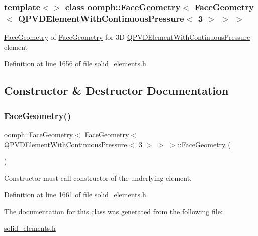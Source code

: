 \subsubsection*{template$<$$>$\newline
class oomph\+::\+Face\+Geometry$<$ Face\+Geometry$<$ Q\+P\+V\+D\+Element\+With\+Continuous\+Pressure$<$ 3 $>$ $>$ $>$}

\hyperlink{classoomph_1_1FaceGeometry}{Face\+Geometry} of \hyperlink{classoomph_1_1FaceGeometry}{Face\+Geometry} for 3D \hyperlink{classoomph_1_1QPVDElementWithContinuousPressure}{Q\+P\+V\+D\+Element\+With\+Continuous\+Pressure} element 

Definition at line 1656 of file solid\+\_\+elements.\+h.



\subsection{Constructor \& Destructor Documentation}
\mbox{\label{classoomph_1_1FaceGeometry_3_01FaceGeometry_3_01QPVDElementWithContinuousPressure_3_013_01_4_01_4_01_4_a8fb064ae3243d87ecc4f983b1423a5c4}} 
\subsubsection{\texorpdfstring{Face\+Geometry()}{FaceGeometry()}}
{\footnotesize\ttfamily \hyperlink{classoomph_1_1FaceGeometry}{oomph\+::\+Face\+Geometry}$<$ \hyperlink{classoomph_1_1FaceGeometry}{Face\+Geometry}$<$ \hyperlink{classoomph_1_1QPVDElementWithContinuousPressure}{Q\+P\+V\+D\+Element\+With\+Continuous\+Pressure}$<$ 3 $>$ $>$ $>$\+::\hyperlink{classoomph_1_1FaceGeometry}{Face\+Geometry} (\begin{DoxyParamCaption}{ }\end{DoxyParamCaption})\hspace{0.3cm}{\ttfamily [inline]}}



Constructor must call constructor of the underlying element. 



Definition at line 1661 of file solid\+\_\+elements.\+h.



The documentation for this class was generated from the following file\+:\begin{DoxyCompactItemize}
\item 
\hyperlink{solid__elements_8h}{solid\+\_\+elements.\+h}\end{DoxyCompactItemize}
